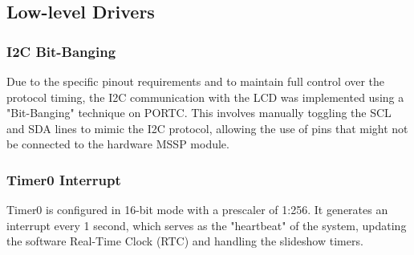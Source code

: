 \subsection{Low-level Drivers}
\subsubsection{I2C Bit-Banging}
Due to the specific pinout requirements and to maintain full control over the protocol timing, the I2C communication with the LCD was implemented using a "Bit-Banging" technique on PORTC. This involves manually toggling the SCL and SDA lines to mimic the I2C protocol, allowing the use of pins that might not be connected to the hardware MSSP module.

\subsubsection{Timer0 Interrupt}
Timer0 is configured in 16-bit mode with a prescaler of 1:256. It generates an interrupt every 1 second, which serves as the "heartbeat" of the system, updating the software Real-Time Clock (RTC) and handling the slideshow timers.
